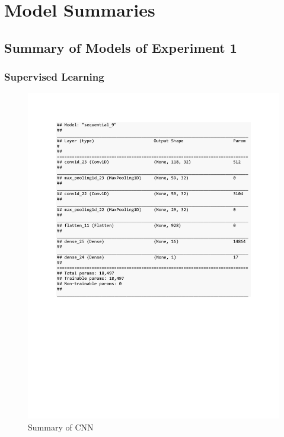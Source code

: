 
\chapter{Model Summaries} %

\label{AppendixA} %

\section{Summary of Models of Experiment 1}

\subsection{Supervised Learning}
\begin{figure}[h]
	\centering
	\includegraphics[scale=0.5]{Figures/summary_CNN_class_syn}
	\decoRule
	\caption[Experiment 1: Summary of CNNs for supervised learning]{Summary of CNN \parencite{own}}
	\label{fig:summary_CNN_class_syn}
\end{figure}

